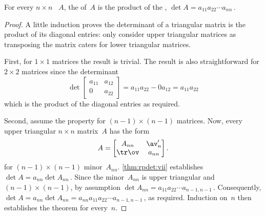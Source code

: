 \begin{theorem}\label{thm:rpdet:vi} 
For every \(n\times n\) ~\(A\),
the  of~\(A\) is the product of the , \(\det A=a_{11}a_{22}\cdots a_{nn}\)\,.
\end{theorem}
\begin{proof} 
A little induction proves the determinant of a triangular matrix is the product of its diagonal entries: only consider upper triangular matrices as transposing the matrix caters for lower triangular matrices.

First, for \(1\times 1\) matrices the result is trivial.
The result is also straightforward for \(2\times 2\) matrices since the determinant
\begin{equation*}
\det\begin{bmatrix} a_{11}&a_{12}\\0&a_{22} \end{bmatrix}
=a_{11}a_{22}-0a_{12}=a_{11}a_{22}
\end{equation*}
which is the product of the diagonal entries as required.

Second, assume the property for \((n-1)\times(n-1)\) matrices.
Now, every upper triangular \(n\times n\) matrix~\(A\) has the form
\begin{equation*}
A=\begin{bmatrix} A_{nn}&\av_n'\\\tr\ov&a_{nn} \end{bmatrix}.
\end{equation*}
for \((n-1)\times(n-1)\) minor~\(A_{nn}\).
\cref{thm:rpdet:vii} establishes \(\det A=a_{nn}\det A_{nn}\)\,.  
Since the  minor~\(A_{nn}\) is upper triangular and \((n-1)\times(n-1)\), by assumption \(\det A_{nn}=a_{11}a_{22}\cdots a_{n-1,n-1}\)\,.
Consequently, \(\det A=a_{nn}\det A_{nn}=a_{nn}a_{11}a_{22}\cdots a_{n-1,n-1}\)\,, as required.
Induction on~\(n\) then establishes the theorem for every~\(n\).
\end{proof}




